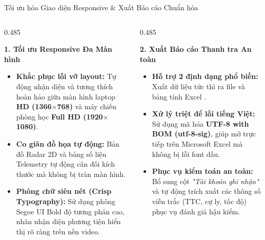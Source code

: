 \documentclass[aspectratio=169, 11pt]{beamer}
\newcommand{\code}[1]{\leavevmode{\ttfamily\color{DarkMain}#1}}
\begin{document}
\begin{frame}{Tối ưu hóa Giao diện Responsive \& Xuất Báo cáo Chuẩn hóa}
  \vspace{-0.15cm}
  \begin{columns}[T, onlytextwidth]
    \begin{column}{0.485\textwidth}
      \begin{tcolorbox}[
        enhanced, colback=white, colframe=DarkMain, boxrule=0.9pt, arc=3.2pt,
        top=4pt, bottom=4pt, left=6pt, right=6pt
      ]
        {\fontsize{8.2pt}{9.8pt}\selectfont\bfseries\color{DarkMain} 1. Tối ưu Responsive Đa Màn hình}\\[3pt]
        {\fontsize{7.0pt}{8.8pt}\selectfont
        \begin{itemize}
          \item \textbf{Khắc phục lỗi vỡ layout:} Tự động nhận diện và tương thích hoàn hảo giữa màn hình laptop \textbf{HD (1366$\times$768)} và máy chiếu phòng học \textbf{Full HD (1920$\times$1080)}.
          \item \textbf{Co giãn đồ họa tự động:} Bản đồ Radar 2D và bảng số liệu Telemetry tự động cân đối kích thước mà không bị tràn màn hình.
          \item \textbf{Phông chữ siêu nét (Crisp Typography):} Sử dụng phông Segoe UI Bold độ tương phản cao, nhãn nhận diện phương tiện hiển thị rõ ràng trên nền video.
        \end{itemize}}
      \end{tcolorbox}
    \end{column}

    \begin{column}{0.485\textwidth}
      \begin{tcolorbox}[
        enhanced, colback=white, colframe=DarkMain, boxrule=0.9pt, arc=3.2pt,
        top=4pt, bottom=4pt, left=6pt, right=6pt
      ]
        {\fontsize{8.2pt}{9.8pt}\selectfont\bfseries\color{DarkMain} 2. Xuất Báo cáo Thanh tra An toàn}\\[3pt]
        {\fontsize{7.0pt}{8.8pt}\selectfont
        \begin{itemize}
          \item \textbf{Hỗ trợ 2 định dạng phổ biến:} Xuất dữ liệu tức thì ra file \code{.csv} và bảng tính Excel \code{.xlsx}.
          \item \textbf{Xử lý triệt để lỗi tiếng Việt:} Sử dụng mã hóa \textbf{UTF-8 with BOM (utf-8-sig)}, giúp mở trực tiếp trên Microsoft Excel mà không bị lỗi font dấu.
          \item \textbf{Phục vụ kiểm toán an toàn:} Bổ sung cột \textit{"Tài khoản ghi nhận"} và tự động trích xuất các thông số viễn trắc (TTC, cự ly, tốc độ) phục vụ đánh giá hậu kiểm.
        \end{itemize}}
      \end{tcolorbox}
    \end{column}
  \end{columns}


\end{frame}
\end{document}
